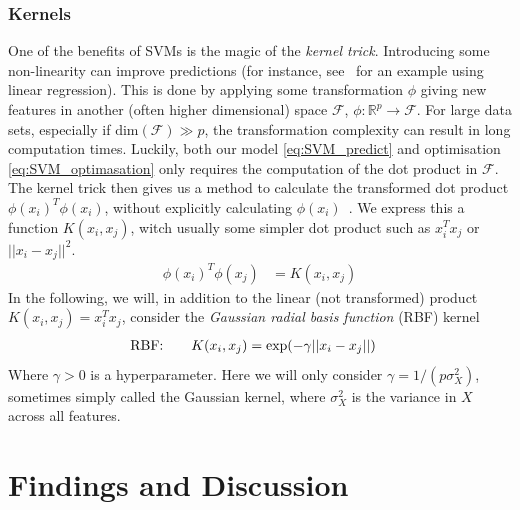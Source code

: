             \subsubsection{Kernels}
                One of the benefits of SVMs is the magic of the \textit{kernel trick}. Introducing some non-linearity can improve predictions (for instance, see~\citep{Project1} for an example using linear regression). This is done by applying some transformation $\phi$ giving new features in another (often higher dimensional) space $\mathcal{F}$, $\phi: \mathbb{R}^p \xrightarrow{} \mathcal{F}$. For large data sets, especially if $\text{dim}(\mathcal{F}) \gg p$, the transformation complexity can result in long computation times. Luckily, both our model \cref{eq:SVM_predict} and optimisation \cref{eq:SVM_optimasation} only requires the computation of the dot product in $\mathcal{F}$. The kernel trick then gives us a method to calculate the transformed dot product $\phi(x_i)^T \phi(x_i)$, without explicitly calculating $\phi(x_i)$~\citep{kernelTrick}. We express this a function $K(x_i, x_j)$, witch usually some simpler dot product such as $x_i^T x_j$ or $||x_i - x_j||^2$.      
                \begin{align*}
                    \phi(x_i)^T \phi(x_j) &= K(x_i, x_j)
                \end{align*}
                In the following, we will, in addition to the linear (not transformed) product $K(x_i, x_j) = x_i^T x_j$, consider the \textit{Gaussian radial basis function} (RBF) kernel
                \begin{align}
                    \text{RBF:}\hspace{20px}& K(x_i, x_j) = \text{exp}(-\gamma ||x_i - x_j||)
                \end{align}
                Where $\gamma > 0$ is a hyperparameter. Here we will only consider $\gamma = 1/(p\sigma_X^2)$, sometimes simply called the Gaussian kernel, where $\sigma_X^2$ is the variance in $X$ across all features. 

    \section{Findings and Discussion}
